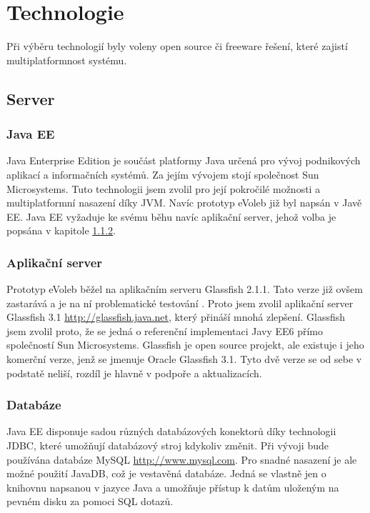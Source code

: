 \documentclass[11pt,twoside,a4paper]{book}
\begin{document}
\section{Technologie}

Při výběru technologií byly voleny open source či freeware řešení, které zajistí multiplatformnost systému.

\subsection{Server}

\subsubsection{Java EE}

Java Enterprise Edition je součást platformy Java určená pro vývoj podnikových aplikací a informačních systémů. Za jejím vývojem stojí společnost Sun Microsystems. Tuto technologii jsem zvolil pro její pokročilé možnosti a multiplatformní nasazení díky JVM.  Navíc prototyp eVoleb již byl napsán v Javě EE. Java EE vyžaduje ke svému běhu navíc aplikační server, jehož volba je popsána v kapitole \ref{aplikacni_server}. 

\subsubsection{Aplikační server} \label{aplikacni_server}

Prototyp eVoleb běžel na aplikačním serveru Glassfish 2.1.1. Tato verze již ovšem zastarává a je na ní problematické testování \cite{www:prototyp}. Proto jsem zvolil aplikační server Glassfish 3.1 \url{http://glassfish.java.net}, který přináší mnohá zlepšení. Glassfish jsem zvolil proto, že se jedná o referenční implementaci Javy EE6 přímo společností Sun Microsystems. Glassfish je open source projekt, ale existuje i jeho komerční verze, jenž se jmenuje Oracle Glassfish 3.1. Tyto dvě verze se od sebe v podstatě neliší, rozdíl je hlavně v podpoře a aktualizacích.

\subsubsection{Databáze}

Java EE disponuje sadou různých databázových konektorů díky technologii JDBC, které umožňují databázový stroj kdykoliv změnit. Při vývoji bude používána databáze MySQL \url{http://www.mysql.com}. Pro snadné nasazení je ale možné použití JavaDB, což je vestavěná databáze. Jedná se vlastně jen o knihovnu napsanou v jazyce Java a umožňuje přístup k datům uloženým na pevném disku za pomoci SQL dotazů.
\end{document}
